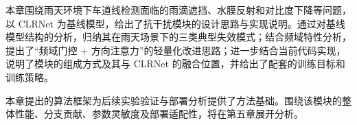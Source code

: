 本章围绕雨天环境下车道线检测面临的雨滴遮挡、水膜反射和对比度下降等问题，以 CLRNet 为基线模型，给出了抗干扰模块的设计思路与实现说明。通过对基线模型结构的分析，归纳其在雨天场景下的三类典型失效模式；结合频域特性分析，提出了“频域门控 + 方向注意力”的轻量化改进思路；进一步结合当前代码实现，说明了模块的组成方式及其与 CLRNet 的融合位置，并给出了配套的训练目标和训练策略。

本章提出的算法框架为后续实验验证与部署分析提供了方法基础。围绕该模块的整体性能、分支贡献、参数灵敏度及部署适配性，将在第五章展开分析。






